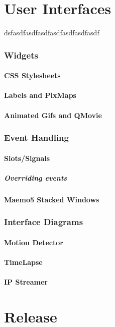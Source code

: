 \documentclass[11pt]{article} %
\begin{document}
\part{User Interfaces}{dsfasdfasdfasdfasdfasdfasdfasdf}
\section{Widgets}
\subsection{CSS Stylesheets}
\subsection{Labels and PixMaps}
\subsection{Animated Gifs and QMovie}
\section{Event Handling}
\subsection{Slots/Signals}
\subsubsection{Overriding events}
\subsection{Maemo5 Stacked Windows}
\section{Interface Diagrams}
\subsection{Motion Detector}
\subsection{TimeLapse}
\subsection{IP Streamer}

\part{Release}
\end{document}
